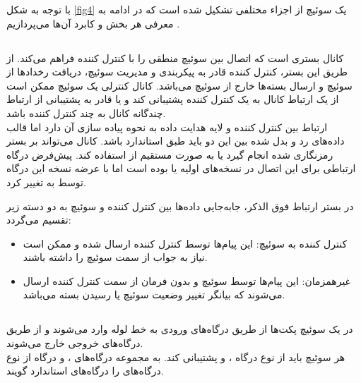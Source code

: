 با توجه به شکل \ref{fig4} یک سوئیچ  از اجزاء مختلفی تشکیل شده است که در ادامه به معرفی هر بخش و کابرد آن‌ها می‌پردازیم \cite{spec}.

\subsection{}
کانال  بستری است که اتصال بین سوئیچ منطقی را با کنترل کننده فراهم می‌کند. از طریق این بستر، کنترل کننده قادر به پیکربندی و مدیریت سوئیچ، دریافت رخداد‌ها از سوئیچ و ارسال بسته‌ها خارج از سوئیچ می‌باشد. کانال کنترلی یک سوئیچ ممکن است از یک ارتباط کانال  به یک کنترل کننده پشتیبانی کند و یا قادر به پشتیبانی از ارتباط چندگانه کانال  به چند کنترل کننده باشد.\\
ارتباط بین کنترل کننده و لایه هدایت داده به نحوه پیاده سازی آن دارد اما قالب داده‌های رد و بدل شده بین این دو باید طبق استاندارد  باشد. کانال  می‌تواند بر بستر رمزنگاری شده  انجام گیرد یا به صورت مستقیم از  استفاده کند. پیش‌فرض درگاه ارتباطی برای این اتصال در نسخه‌های اولیه  یا  بوده است اما با عرضه نسخه  این درگاه توسط  به  تغییر کرد.
\pagebreak

در بستر ارتباط فوق الذکر، جا‌به‌جایی داده‌ها بین کنترل کننده و سوئیچ به دو دسته زیر تقسیم می‌گردد:
\begin{itemize}
	\item
کنترل کننده به سوئیچ: این پیام‌ها توسط کنترل کننده ارسال شده و ممکن است نیاز به جواب از سمت سوئیچ را داشته باشند.
	\item
غیر‌همزمان: این پیام‌ها توسط سوئیچ و بدون فرمان از سمت کنترل کننده ارسال می‌شوند که بیانگر تغییر وضعیت سوئیچ یا رسیدن بسته می‌باشد.
\end{itemize}

\subsection{}
در یک سوئیچ  پکت‌ها از طریق درگاه‌های ورودی به خط لوله وارد می‌شوند و از طریق درگاه‌های خروجی خارج می‌شوند.\\
هر سوئیچ  باید از نوع درگاه ،  و  پشتیبانی کند. به مجموعه درگاه‌های ،  و درگاه  از نوع درگاه‌های  را درگاه‌های استاندارد گویند.

